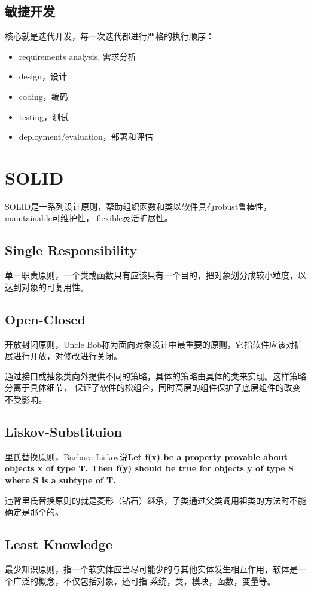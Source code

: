 \subsection{敏捷开发}
核心就是迭代开发，每一次迭代都进行严格的执行顺序：
\begin{itemize}
    \item {requirements analysis, 需求分析}
    \item {design，设计}
    \item {coding，编码}
    \item {testing，测试}
    \item {deployment/evaluation，部署和评估}
\end{itemize}


\section{SOLID}

SOLID是一系列设计原则，帮助组织函数和类以软件具有robust鲁棒性，maintainable可维护性，
flexible灵活扩展性。

\subsection{Single Responsibility}
单一职责原则，一个类或函数只有应该只有一个目的，把对象划分成较小粒度，以达到对象的可复用性。

\subsection{Open-Closed}
开放封闭原则，Uncle Bob称为面向对象设计中最重要的原则，它指软件应该对扩展进行开放，对修改进行关闭。

通过接口或抽象类向外提供不同的策略，具体的策略由具体的类来实现。这样策略分离于具体细节，
保证了软件的松组合，同时高层的组件保护了底层组件的改变不受影响。

\subsection{Liskov-Substituion}
里氏替换原则，Barbara Liskov说\textbf{Let f(x) be a property provable about objects x of type T.
Then f(y) should be true for objects y of type S where S is a subtype of T.}

违背里氏替换原则的就是菱形（钻石）继承，子类通过父类调用祖类的方法时不能确定是那个的。

\subsection{Least Knowledge}
最少知识原则，指一个软实体应当尽可能少的与其他实体发生相互作用，软体是一个广泛的概念，不仅包括对象，还可指
系统，类，模块，函数，变量等。

